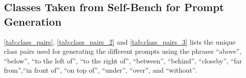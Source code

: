 
\subsection{Classes Taken from Self-Bench for Prompt Generation}
\label{sec:appendix_class_pairs}
\cref{tab:class_pairs}, \cref{tab:class_pairs_2} and \cref{tab:class_pairs_3} lists the unique class pairs used for generating the different prompts using the phrases ``above'', ``below'', ``to the left of'', ``to the right of'', ``between'', ``behind'', ``closeby'', ``far from'',``in front of'', ``on top of'', ``under'', ``over'', and ``without''.



